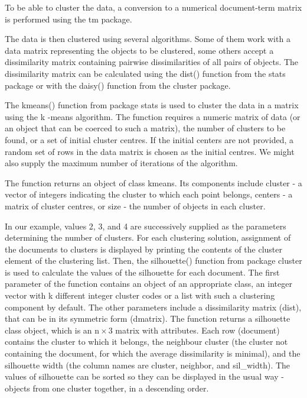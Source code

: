 \documentclass[10pt]{book}
\begin{document}
To be able to cluster the data, a conversion to a numerical document-term matrix is performed using the tm package.

The data is then clustered using several algorithms. Some of them work with a data matrix representing the objects to be clustered, some others accept a dissimilarity matrix containing pairwise dissimilarities of all pairs of objects. The\\
dissimilarity matrix can be calculated using the dist() function from the stats package or with the daisy() function from the cluster package.

The kmeans() function from package stats is used to cluster the data in a matrix using the k -means algorithm. The function requires a numeric matrix of data (or an object that can be coerced to such a matrix), the number of clusters to be found, or a set of initial cluster centres. If the initial centers are not provided, a random set of rows in the data matrix is chosen as the initial centres. We might also supply the maximum number of iterations of the algorithm.

The function returns an object of class kmeans. Its components include cluster - a vector of integers indicating the cluster to which each point belongs, centers - a matrix of cluster centres, or size - the number of objects in each cluster.

In our example, values 2, 3, and 4 are successively supplied as the parameters determining the number of clusters. For each clustering solution, assignment of the documents to clusters is displayed by printing the contents of the cluster element of the clustering list. Then, the silhouette() function from package cluster is used to calculate the values of the silhouette for each document. The first parameter of the function contains an object of an appropriate class, an integer vector with k different integer cluster codes or a list with such a clustering component by default. The other parameters include a dissimilarity matrix (dist), that can be in its symmetric form (dmatrix). The function returns a silhouette class object, which is an $\mathrm{n} \times 3$ matrix with attributes. Each row (document) contains the cluster to which it belongs, the neighbour cluster (the cluster not containing the document, for which the average dissimilarity is minimal), and the silhouette width (the column names are cluster, neighbor, and sil\_width). The values of silhouette can be sorted so they can be displayed in the usual way - objects from one cluster together, in a descending order.
\end{document}
